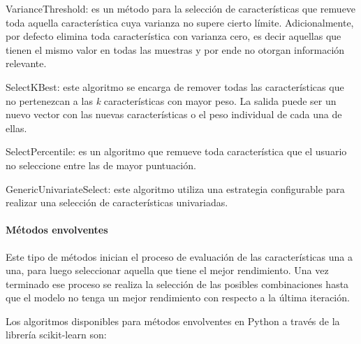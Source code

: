  \begin{APAitemize}
     \item VarianceThreshold: es un método para la selección de características que remueve toda aquella característica cuya varianza no supere cierto límite. Adicionalmente, por defecto elimina toda característica con varianza cero, es decir aquellas que tienen el mismo valor en todas las muestras y por ende no otorgan información relevante.
     \item SelectKBest: este algoritmo se encarga de remover todas las características que no pertenezcan a las \textit{k} características con mayor peso. La salida puede ser un nuevo vector con las nuevas características o el peso individual de cada una de ellas.
     \item SelectPercentile: es un algoritmo que remueve toda característica que el usuario no seleccione entre las de mayor puntuación.
     \item GenericUnivariateSelect: este algoritmo utiliza una estrategia configurable para realizar una selección de características univariadas.
 \end{APAitemize}
 
\paragraph{Métodos envolventes} Este tipo de métodos inician el proceso de evaluación de las características una a una, para luego seleccionar aquella que tiene el mejor rendimiento. Una vez terminado ese proceso se realiza la selección de las posibles combinaciones hasta que el modelo no tenga un mejor rendimiento con respecto a la última iteración. 
 
Los algoritmos disponibles para métodos envolventes en Python a través de la librería scikit-learn \parencite{sklearn_api} son:
 
